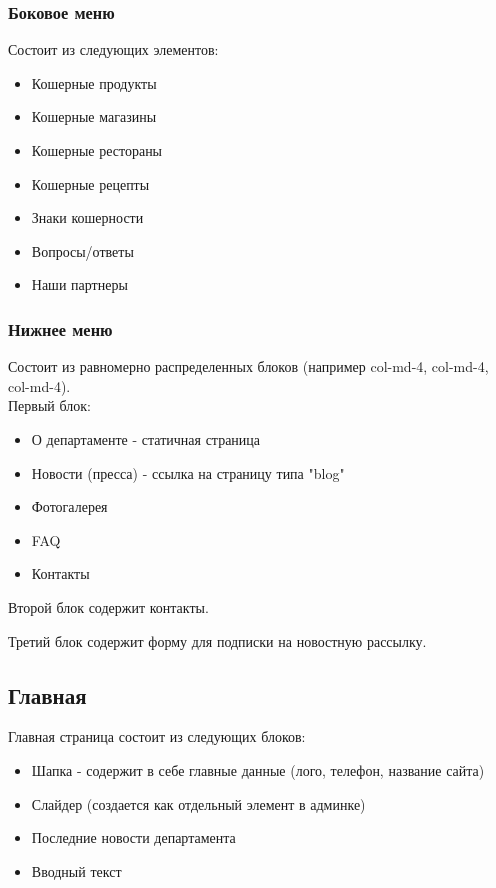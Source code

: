 \documentclass[DIV=calc, paper=a4, fontsize=11pt]{scrartcl} %
\begin{document}
\subsubsection{Боковое меню}

Состоит из следующих элементов:
\begin{itemize}
	\item Кошерные продукты
	\item Кошерные магазины
	\item Кошерные рестораны
	\item Кошерные рецепты
	\item Знаки кошерности
	\item Вопросы/ответы
	\item Наши партнеры
\end{itemize}


\subsubsection{Нижнее меню}
Состоит из равномерно распределенных блоков (например col-md-4, col-md-4, col-md-4). 
\\[0.5cm]
Первый блок:
\begin{itemize}
	\item О департаменте - статичная страница
	\item Новости (пресса) - ссылка на страницу типа "blog"
	\item Фотогалерея
	\item FAQ
	\item Контакты
\end{itemize}

Второй блок содержит контакты.

Третий блок содержит форму для подписки на новостную рассылку.


\subsection{Главная}
Главная страница состоит из следующих блоков:
\begin{itemize}
	\item Шапка - содержит в себе главные данные (лого, телефон, название сайта)
	\item Слайдер (создается как отдельный элемент в админке)
	\item Последние новости департамента
	\item Вводный текст
\end{itemize}
\end{document}
